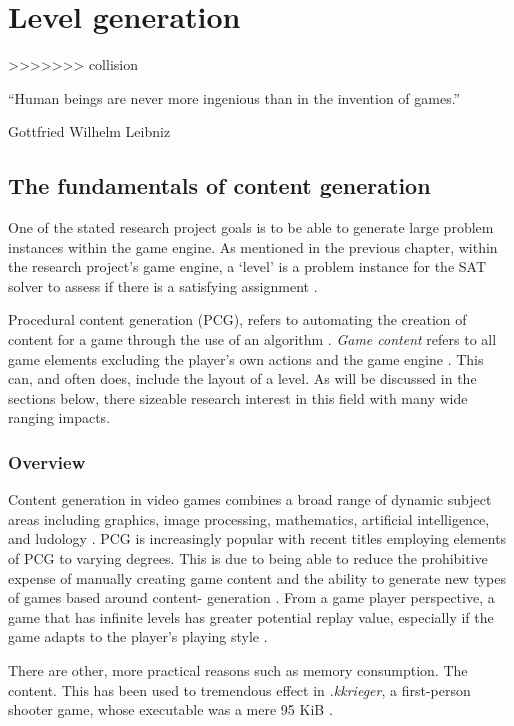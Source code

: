 \documentclass[11pt, a4paper, oneside]{report} %
\begin{document}
\chapter{Level generation}
>>>>>>> collision


\epigraph{``Human beings are never more ingenious than in the invention of
games.''}{Gottfried Wilhelm Leibniz}


\section{The fundamentals of content generation}

One of the stated research project goals is to be able to generate large problem
instances within the game engine. As mentioned in the previous chapter, within
the research project's game engine, a `level' is a problem instance for the SAT
solver to assess if there is a satisfying assignment \cite{Aloupis2012} .

Procedural content generation (PCG), refers to automating the creation of
content for a game through the use of an algorithm
\cite{Hendrikx:2013:PCG:2422956.2422957, 5756645}. \textit{Game content} refers
to all game elements excluding the player's own actions and the game engine
\cite{Burgun:2012}. This can, and often does, include the layout of a level. As
will be discussed in the sections below, there sizeable research interest in
this field with many wide ranging impacts.

\subsection{Overview}

Content generation in video games combines a broad range of dynamic subject
areas including graphics, image processing, mathematics, artificial
intelligence, and ludology \cite{Hendrikx:2013:PCG:2422956.2422957}. PCG is
increasingly popular with recent titles employing elements of PCG to varying
degrees. This is due to being able to reduce the prohibitive expense of manually
creating game content \cite{Hendrikx:2013:PCG:2422956.2422957} and the ability
to generate new types of games based around content- generation \cite{5756645}.
From a game player perspective, a game that has infinite levels has greater
potential replay value, especially if the game adapts to the player's playing
style \cite{6424299}.

There are other, more practical reasons such as memory
consumption. The content. This has been used to tremendous effect in \textit{.kkrieger}, a
first-person shooter game, whose executable was a mere 95 KiB
\cite{Hendrikx:2013:PCG:2422956.2422957}.
\end{document}
